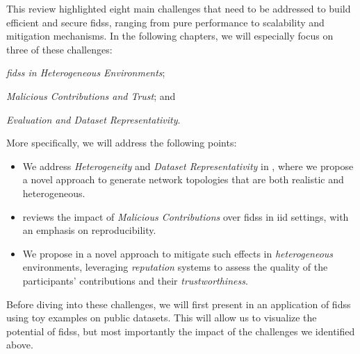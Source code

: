 This review highlighted eight main challenges that need to be addressed to build efficient and secure \glspl{fids}, ranging from pure performance to scalability and mitigation mechanisms.
In the following chapters, we will especially focus on three of these challenges: 
\begin{enumerate*}[(i)]
    \item \emph{\glspl{fids} in Heterogeneous Environments};
    \item \emph{Malicious Contributions and Trust}; and
    \item \emph{Evaluation and Dataset Representativity}.
\end{enumerate*}
More specifically, we will address the following points:
\begin{itemize}
  \item We address \emph{Heterogeneity} and \emph{Dataset Representativity} in , where we propose a novel approach to generate network topologies that are both realistic and heterogeneous.
  
  \item {} reviews the impact of \emph{Malicious Contributions} over \glspl{fids} in \gls{iid} settings, with an emphasis on reproducibility.
  
  \item We propose in  a novel approach to mitigate such effects in \emph{heterogeneous} environments, leveraging \emph{reputation} systems to assess the quality of the participants' contributions and their \emph{trustworthiness}.
\end{itemize}

Before diving into these challenges, we will first present in  an application of \glspl{fids} using toy examples on public datasets.
This will allow us to visualize the potential of \glspl{fids}, but most importantly the impact of the challenges we identified above.